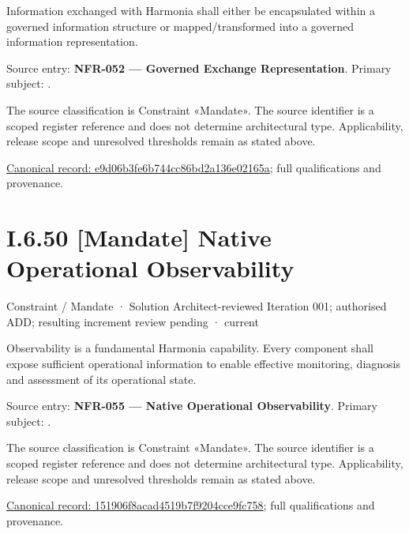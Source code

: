 Information exchanged with Harmonia shall either be encapsulated within a governed information structure or mapped/transformed into a governed information representation.



Source entry: \textbf{NFR-052 — Governed Exchange Representation}. Primary subject: \texttt{}.



The source classification is Constraint «Mandate». The source identifier is a scoped register reference and does not determine architectural type. Applicability, release scope and unresolved thresholds remain as stated above.


{\footnotesize \href{../../../../../../../../continuum/motivation/constraint/mandate/e9d06b3fe6b744cc86bd2a136e02165a.md}{Canonical record: e9d06b3fe6b744cc86bd2a136e02165a}; full qualifications and provenance.}\par
\section*{I.6.50 [Mandate] Native Operational Observability}
\label{navigation:I.6.50}

\label{element:151906f8acad4519b7f9204cce9fc758}
{\small Constraint / Mandate · Solution Architect-reviewed Iteration 001; authorised ADD; resulting increment review pending · current}\par

Observability is a fundamental Harmonia capability. Every component shall expose sufficient operational information to enable effective monitoring, diagnosis and assessment of its operational state.



Source entry: \textbf{NFR-055 — Native Operational Observability}. Primary subject: \texttt{}.



The source classification is Constraint «Mandate». The source identifier is a scoped register reference and does not determine architectural type. Applicability, release scope and unresolved thresholds remain as stated above.


{\footnotesize \href{../../../../../../../../continuum/motivation/constraint/mandate/151906f8acad4519b7f9204cce9fc758.md}{Canonical record: 151906f8acad4519b7f9204cce9fc758}; full qualifications and provenance.}\par
